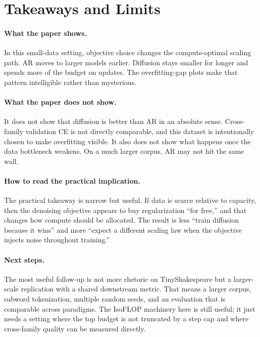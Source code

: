 \documentclass[11pt,a4paper]{article}
\begin{document}
\section{Takeaways and Limits}
\label{sec:discussion}

\paragraph{What the paper shows.}
In this small-data setting, objective choice changes the compute-optimal scaling path.
AR moves to larger models earlier.
Diffusion stays smaller for longer and spends more of the budget on updates.
The overfitting-gap plots make that pattern intelligible rather than mysterious.

\paragraph{What the paper does not show.}
It does not show that diffusion is better than AR in an absolute sense.
Cross-family validation CE is not directly comparable, and this dataset is intentionally chosen to make overfitting visible.
It also does not show what happens once the data bottleneck weakens.
On a much larger corpus, AR may not hit the same wall.

\paragraph{How to read the practical implication.}
The practical takeaway is narrow but useful.
If data is scarce relative to capacity, then the denoising objective appears to buy regularization ``for free,'' and that changes how compute should be allocated.
The result is less ``train diffusion because it wins'' and more ``expect a different scaling law when the objective injects noise throughout training.''

\paragraph{Next steps.}
The most useful follow-up is not more rhetoric on TinyShakespeare but a larger-scale replication with a shared downstream metric.
That means a larger corpus, subword tokenization, multiple random seeds, and an evaluation that is comparable across paradigms.
The IsoFLOP machinery here is still useful; it just needs a setting where the top budget is not truncated by a step cap and where cross-family quality can be measured directly.
\end{document}
